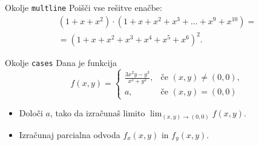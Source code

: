 \begin{frame}{Okolje \texttt{multline}}
    Poišči vse rešitve enačbe:
    \begin{multline*}
        (1 + x + x^2) \cdot (1 + x + x^2 + x^3 + \ldots + x^9 + x^{10}) = \\ 
        = (1 + x + x^2 + x^3 + x^4 + x^5 + x^6)^2.
    \end{multline*}
\end{frame}

\begin{frame}{Okolje \texttt{cases}}
	Dana je funkcija
	\[
	f(x, y) =
	\begin{cases}
		
	\frac{3x^2y-y^3}{x^2+y^2}, & \text{če } (x, y) \neq (0, 0), \\
	a, & \text{če } (x, y) = (0,0)
	\end{cases}
	\]
		
	\begin{itemize}
	\item Določi $a$, tako da izračunaš limito \( \lim_{(x,y)\to(0,0)} f(x,y). \)
	\item Izračunaj parcialna odvoda $f_x(x,y)$ in $f_y(x,y)$.
	\end{itemize}
\end{frame}
